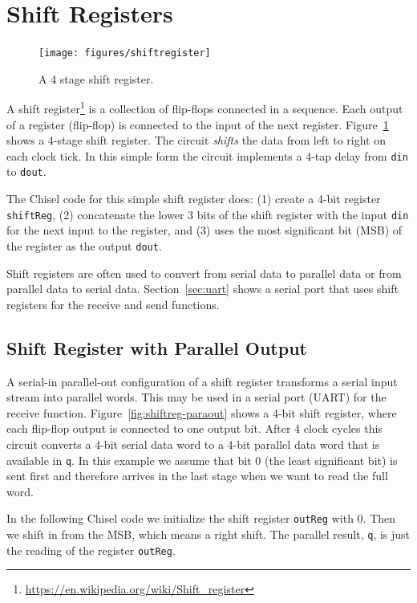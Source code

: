 \documentclass[%
    10pt,
    headinclude, footexclude,
    openright, %
    notitlepage,
    cleardoubleempty,
    headsepline,
    pointlessnumbers,
    bibtotoc, idxtotoc,
    ]{scrbook}
\newcommand{\code}[1]{{\small{\texttt{#1}}}}
\newcommand{\myref}[2]{\href{#1}{#2}}
\renewcommand{\myref}[2]{{#2}{\footnote{\url{#1}}}}
\begin{document}
\section{Shift Registers}

\begin{figure}
  \centering
  \texttt{[image: figures/shiftregister]}
  \caption{A 4 stage shift register.}
  \label{fig:shiftregister}
\end{figure}


A \myref{https://en.wikipedia.org/wiki/Shift_register}{shift register} is a collection of flip-flops
connected in a sequence. Each output of a register (flip-flop) is connected to the input of the
next register. Figure~\ref{fig:shiftregister} shows a 4-stage shift register.
The circuit \emph{shifts} the data from left to right on each clock tick. In this simple form the
circuit implements a 4-tap delay from \code{din} to \code{dout}.

The Chisel code for this simple shift register does: (1) create a 4-bit register \code{shiftReg},
(2) concatenate the lower 3 bits of the shift register with the input \code{din} for the next
input to the register, and (3) uses the most significant bit (MSB) of the register as the output \code{dout}.


Shift registers are often used to convert from serial data to parallel data or from parallel data
to serial data. Section~\ref{sec:uart} shows a serial port that uses shift registers for the receive and
send functions.

\subsection{Shift Register with Parallel Output}

A serial-in parallel-out configuration of a shift register transforms a serial input stream into parallel
words. This may be used in a serial port (UART) for the receive function.
Figure~\ref{fig:shiftreg-paraout} shows a 4-bit shift register, where each flip-flop output
is connected to one output bit. After 4 clock cycles this circuit converts a 4-bit serial data word
to a 4-bit parallel data word that is available in \code{q}. In this example we assume that bit 0
(the least significant bit) is sent first and therefore arrives in the last stage when we want to read
the full word.

In the following Chisel code we initialize the shift register \code{outReg} with 0. Then we shift in from the
MSB, which means a right shift. The parallel result, \code{q}, is just the reading of the register
\code{outReg}.
\end{document}
